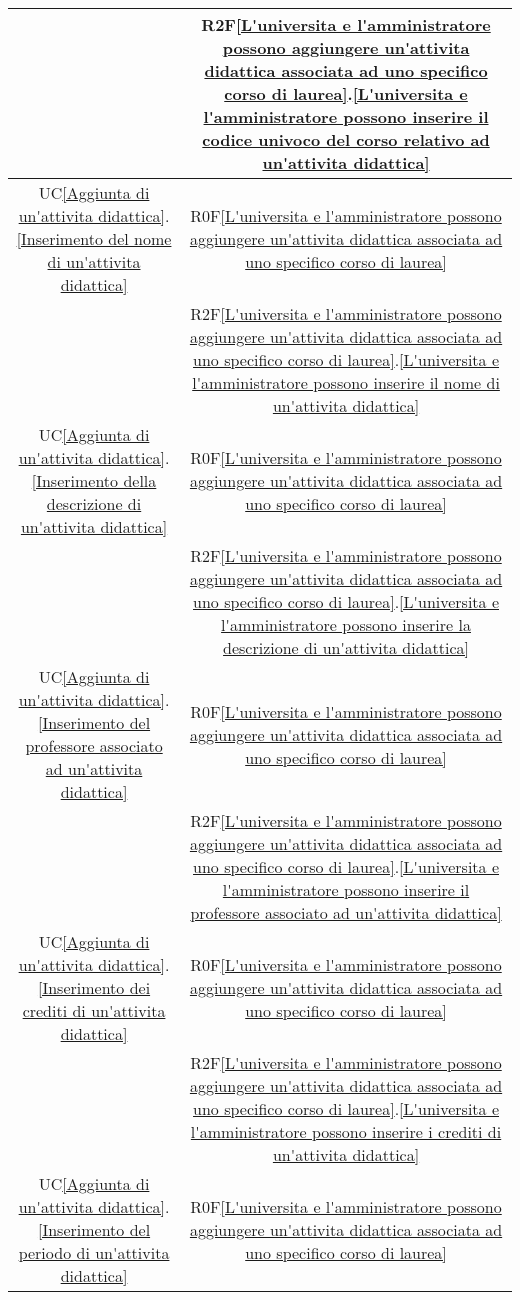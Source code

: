 \begin{longtable}{|c|c|}
& R2F\ref{L'universita e l'amministratore possono aggiungere un'attivita didattica associata ad uno specifico corso di laurea}.\ref{L'universita e l'amministratore possono inserire il codice univoco del corso relativo ad un'attivita didattica}\\
\hline
UC\ref{Aggiunta di un'attivita didattica}.\ref{Inserimento del nome di un'attivita didattica} & R0F\ref{L'universita e l'amministratore possono aggiungere un'attivita didattica associata ad uno specifico corso di laurea}\\
& R2F\ref{L'universita e l'amministratore possono aggiungere un'attivita didattica associata ad uno specifico corso di laurea}.\ref{L'universita e l'amministratore possono inserire il nome di un'attivita didattica}\\
\hline
UC\ref{Aggiunta di un'attivita didattica}.\ref{Inserimento della descrizione di un'attivita didattica} & R0F\ref{L'universita e l'amministratore possono aggiungere un'attivita didattica associata ad uno specifico corso di laurea}\\
& R2F\ref{L'universita e l'amministratore possono aggiungere un'attivita didattica associata ad uno specifico corso di laurea}.\ref{L'universita e l'amministratore possono inserire la descrizione di un'attivita didattica}\\
\hline
UC\ref{Aggiunta di un'attivita didattica}.\ref{Inserimento del professore associato ad un'attivita didattica} & R0F\ref{L'universita e l'amministratore possono aggiungere un'attivita didattica associata ad uno specifico corso di laurea}\\
& R2F\ref{L'universita e l'amministratore possono aggiungere un'attivita didattica associata ad uno specifico corso di laurea}.\ref{L'universita e l'amministratore possono inserire il professore associato ad un'attivita didattica}\\
\hline
UC\ref{Aggiunta di un'attivita didattica}.\ref{Inserimento dei crediti di un'attivita didattica} & R0F\ref{L'universita e l'amministratore possono aggiungere un'attivita didattica associata ad uno specifico corso di laurea}\\
& R2F\ref{L'universita e l'amministratore possono aggiungere un'attivita didattica associata ad uno specifico corso di laurea}.\ref{L'universita e l'amministratore possono inserire i crediti di un'attivita didattica}\\
\hline
UC\ref{Aggiunta di un'attivita didattica}.\ref{Inserimento del periodo di un'attivita didattica} & R0F\ref{L'universita e l'amministratore possono aggiungere un'attivita didattica associata ad uno specifico corso di laurea}\\

\end{longtable}
